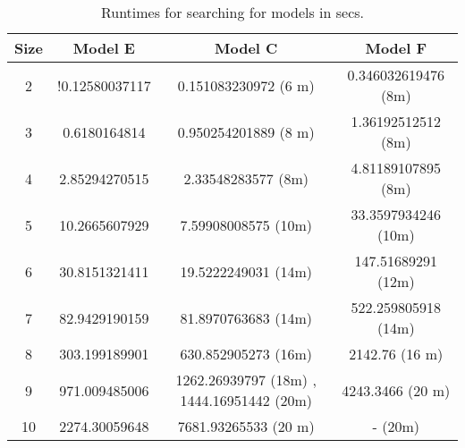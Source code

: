\begin{table}[t]
  \centering
  \begin{tabular}[t]{|c|c|c|c|}\hline
    \textbf{Size} &  \textbf{Model E}   & \textbf{ Model C} &  \textbf{Model F} \\\hline
   
    2 & !0.12580037117 & 0.151083230972 (6 m) & 0.346032619476 (8m)\\\hline
    3 & 0.6180164814 & 0.950254201889 (8 m) & 1.36192512512 (8m)\\\hline
    4 & 2.85294270515 & 2.33548283577 (8m)& 4.81189107895 (8m)\\\hline
    5 & 10.2665607929 & 7.59908008575 (10m)& 33.3597934246 (10m) \\\hline
    6 & 30.8151321411 & 19.5222249031 (14m)& 147.51689291 (12m)\\\hline
    7 & 82.9429190159& 81.8970763683 (14m)& 522.259805918 (14m)\\\hline
    8 & 303.199189901 &  630.852905273 (16m)&  2142.76 (16 m)\\\hline
    9 & 971.009485006& 1262.26939797 (18m) , 1444.16951442 (20m)
& 4243.3466 (20 m)\\\hline
    10 & 2274.30059648 &  7681.93265533 (20 m) &  - (20m)\\\hline
  \end{tabular}
  \caption{Runtimes for searching for models in secs.}
  \label{tab:qf-grabh}
\end{table}



